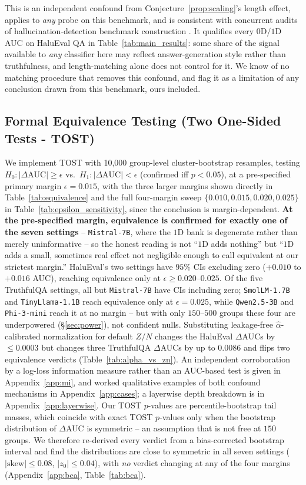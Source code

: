 \documentclass{article}
\begin{document}
This is an independent confound from Conjecture~\ref{prop:scaling}'s length effect, applies to \emph{any} probe on this benchmark, and is consistent with concurrent audits of hallucination-detection benchmark construction \citep{hussain2026parallax, janiak2025illusion}. It qualifies every $0$D/$1$D AUC on HaluEval QA in Table~\ref{tab:main_results}: some share of the signal available to \emph{any} classifier here may reflect answer-generation style rather than truthfulness, and length-matching alone does not control for it. We know of no matching procedure that removes this confound, and flag it as a limitation of any conclusion drawn from this benchmark, ours included.

\subsection{Formal Equivalence Testing (Two One-Sided Tests - TOST)}
We implement TOST with 10,000 group-level cluster-bootstrap resamples, testing $H_0: |\Delta\text{AUC}|\ge\epsilon$ vs.\ $H_1: |\Delta\text{AUC}|<\epsilon$ (confirmed iff $p<0.05$), at a pre-specified primary margin $\epsilon=0.015$, with the three larger margins shown directly in Table~\ref{tab:equivalence} and the full four-margin sweep $\{0.010,0.015,0.020,0.025\}$ in Table~\ref{tab:epsilon_sensitivity}, since the conclusion is margin-dependent. \textbf{At the pre-specified margin, equivalence is confirmed for exactly one of the seven settings} -- \texttt{Mistral-7B}, where the $1$D bank is degenerate rather than merely uninformative -- so the honest reading is not ``$1$D adds nothing'' but ``$1$D adds a small, sometimes real effect not negligible enough to call equivalent at our strictest margin.'' HaluEval's two settings have $95\%$ CIs excluding zero ($+0.010$ to $+0.016$ AUC), reaching equivalence only at $\epsilon\ge0.020$--$0.025$. Of the five TruthfulQA settings, all but \texttt{Mistral-7B} have CIs including zero; \texttt{SmolLM-1.7B} and \texttt{TinyLlama-1.1B} reach equivalence only at $\epsilon{=}0.025$, while \texttt{Qwen2.5-3B} and \texttt{Phi-3-mini} reach it at no margin -- but with only $150$--$500$ groups these four are underpowered (\S\ref{sec:power}), not confident nulls. Substituting leakage-free $\hat\alpha$-calibrated normalization for default $Z/N$ changes the HaluEval $\Delta$AUCs by $\le 0.0003$ but changes three TruthfulQA $\Delta$AUCs by up to $0.0086$ and flips two equivalence verdicts (Table~\ref{tab:alpha_vs_zn}). An independent corroboration by a log-loss information measure rather than an AUC-based test is given in Appendix~\ref{app:mi}, and worked qualitative examples of both confound mechanisms in Appendix~\ref{app:cases}; a layerwise depth breakdown is in Appendix~\ref{app:layerwise}. Our TOST $p$-values are percentile-bootstrap tail masses, which coincide with exact TOST $p$-values only when the bootstrap distribution of $\Delta$AUC is symmetric -- an assumption that is not free at $150$ groups. We therefore re-derived every verdict from a bias-corrected bootstrap interval and find the distributions are close to symmetric in all seven settings ($|\text{skew}|\le0.08$, $|z_0|\le0.04$), with \emph{no} verdict changing at any of the four margins (Appendix~\ref{app:bca}, Table~\ref{tab:bca}).
\end{document}
